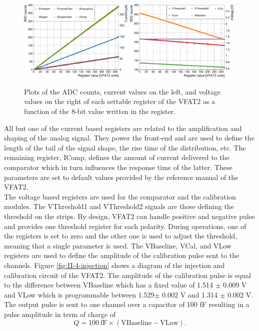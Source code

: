       \begin{figure}[b!]
        \centering
        \includegraphics[width=0.49\textwidth]{img/plots/cADC_Current-crop}
        \includegraphics[width=0.49\textwidth]{img/plots/cADC_Voltage-crop}
        \caption{Plots of the ADC counts, current values on the left, and voltage values on the right of each settable register of the VFAT2 as a function of the 8-bit value written in the register.}
        \label{fig:II-4-adc}
      \end{figure}

      All but one of the current based registers are related to the amplification and shaping of the analog signal. They power the front-end and are used to define the length of the tail of the signal shape, the rise time of the distribution, etc. The remaining register, IComp, defines the amount of current delivered to the comparator which in turn influences the response time of the latter. These parameters are set to default values provided by the reference manual of the VFAT2. \\

      The voltage based registers are used for the comparator and the calibration modules. The VThreshold1 and VThreshold2 signals are those defining the threshold on the strips. By design, VFAT2 can handle positive and negative pulse and provides one threshold register for each polarity. During operations, one of the registers is set to zero and the other one is used to adjust the threshold, meaning that a single parameter is used. The VBaseline, VCal, and VLow registers are used to define the amplitude of the calibration pulse sent to the channels. Figure \ref{fig:II-4-injection} shows a diagram of the injection and calibration circuit of the VFAT2. The amplitude of the calibration pulse is equal to the difference between VBaseline which has a fixed value of 1.514 $\pm$ 0.009 V and VLow which is programmable between 1.529$\pm$ 0.002 V and 1.314 $\pm$ 0.002 V. The output pulse is sent to one channel over a capacitor of 100 fF resulting in a pulse amplitude in term of charge of
      \begin{equation}
        \label{eq:II-4-injection}
        Q = 100 \ \text{fF} \times \left(\text{VBaseline} - \text{VLow} \right) .
      \end{equation}

